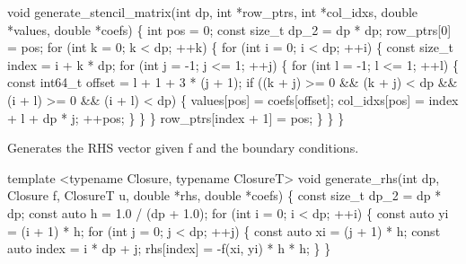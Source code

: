 {\ttfamily 
\begin{DoxyCode}
\textcolor{keywordtype}{void} generate\_stencil\_matrix(\textcolor{keywordtype}{int} dp, \textcolor{keywordtype}{int} *row\_ptrs, \textcolor{keywordtype}{int} *col\_idxs,
                             \textcolor{keywordtype}{double} *values, \textcolor{keywordtype}{double} *coefs)
\{
    \textcolor{keywordtype}{int} pos = 0;
    \textcolor{keyword}{const} \textcolor{keywordtype}{size\_t} dp\_2 = dp * dp;
    row\_ptrs[0] = pos;
    \textcolor{keywordflow}{for} (\textcolor{keywordtype}{int} k = 0; k < dp; ++k) \{
        \textcolor{keywordflow}{for} (\textcolor{keywordtype}{int} i = 0; i < dp; ++i) \{
            \textcolor{keyword}{const} \textcolor{keywordtype}{size\_t} index = i + k * dp;
            \textcolor{keywordflow}{for} (\textcolor{keywordtype}{int} j = -1; j <= 1; ++j) \{
                \textcolor{keywordflow}{for} (\textcolor{keywordtype}{int} l = -1; l <= 1; ++l) \{
                    \textcolor{keyword}{const} int64\_t offset = l + 1 + 3 * (j + 1);
                    \textcolor{keywordflow}{if} ((k + j) >= 0 && (k + j) < dp && (i + l) >= 0 &&
                        (i + l) < dp) \{
                        values[pos] = coefs[offset];
                        col\_idxs[pos] = index + l + dp * j;
                        ++pos;
                    \}
                \}
            \}
            row\_ptrs[index + 1] = pos;
        \}
    \}
\}
\end{DoxyCode}
}

{\ttfamily  Generates the R\+HS vector given {\ttfamily f} and the boundary conditions.}

{\ttfamily 
\begin{DoxyCode}
\textcolor{keyword}{template} <\textcolor{keyword}{typename} Closure, \textcolor{keyword}{typename} ClosureT>
\textcolor{keywordtype}{void} generate\_rhs(\textcolor{keywordtype}{int} dp, Closure f, ClosureT u, \textcolor{keywordtype}{double} *rhs, \textcolor{keywordtype}{double} *coefs)
\{
    \textcolor{keyword}{const} \textcolor{keywordtype}{size\_t} dp\_2 = dp * dp;
    \textcolor{keyword}{const} \textcolor{keyword}{auto} h = 1.0 / (dp + 1.0);
    \textcolor{keywordflow}{for} (\textcolor{keywordtype}{int} i = 0; i < dp; ++i) \{
        \textcolor{keyword}{const} \textcolor{keyword}{auto} yi = (i + 1) * h;
        \textcolor{keywordflow}{for} (\textcolor{keywordtype}{int} j = 0; j < dp; ++j) \{
            \textcolor{keyword}{const} \textcolor{keyword}{auto} xi = (j + 1) * h;
            \textcolor{keyword}{const} \textcolor{keyword}{auto} index = i * dp + j;
            rhs[index] = -f(xi, yi) * h * h;
        \}
    \}
\end{DoxyCode}
}

